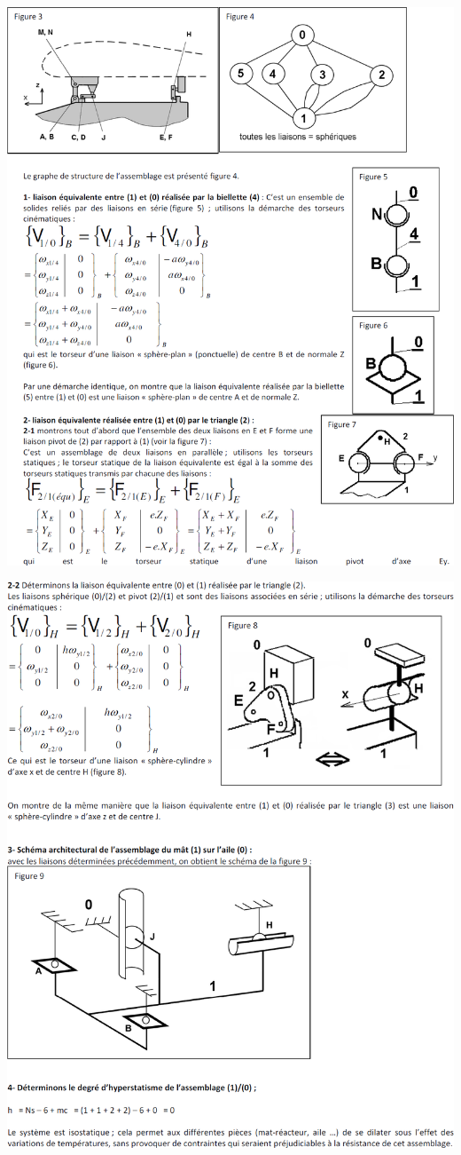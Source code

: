 \documentclass[10pt,fleqn]{article} %
\begin{document}
\begin{center}
\includegraphics[width=.95\linewidth]{images/cor_03}
\end{center}

\begin{center}
\includegraphics[width=.95\linewidth]{images/cor_04}
\end{center}
\end{document}
